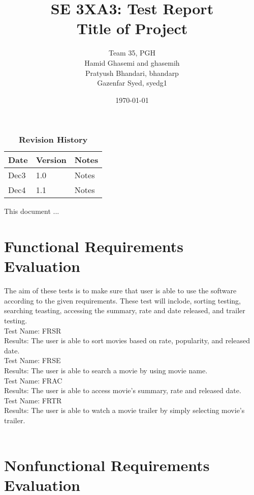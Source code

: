 \documentclass[12pt, titlepage]{article}
\title{SE 3XA3: Test Report\\Title of Project}
\author{Team 35, PGH
		\\ Hamid Ghasemi and ghasemih
		\\ Pratyush Bhandari, bhandarp
		\\ Gazenfar Syed, syedg1
}
\date{\today}
\begin{document}
\maketitle

\tableofcontents
\listoftables
\listoffigures

\begin{table}[bp]
\caption{\bf Revision History}
\begin{tabularx}{\textwidth}{p{3cm}p{2cm}X}
\toprule {\bf Date} & {\bf Version} & {\bf Notes}\\
\midrule
Dec3 & 1.0 & Notes\\
Dec4 & 1.1 & Notes\\
\bottomrule
\end{tabularx}
\end{table}

\newpage


This document ...

\section{Functional Requirements Evaluation}
The aim of these tests is to make sure that user is able to use the software according to the given requirements. These test will inclode, sorting testing, searching teasting, accessing the summary, rate and date released, and trailer testing.\\

Test Name: FRSR \\
Results: The user is able to sort movies based on rate, popularity, and released date. \\ 

Test Name: FRSE \\
Results: The user is able to search a movie by using movie name. \\ 

Test Name: FRAC \\
Results: The user is able to access movie's summary, rate and released date.\\ 

Test Name: FRTR\\
Results: The user is able to watch a movie trailer by simply selecting movie's trailer. \\ \\

\section{Nonfunctional Requirements Evaluation}
\end{document}
